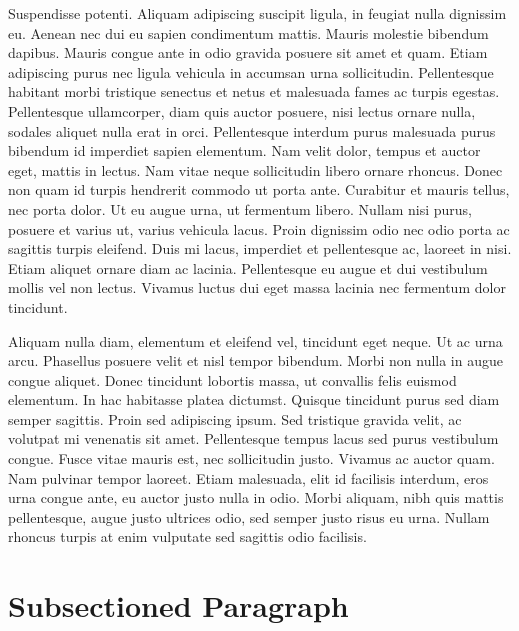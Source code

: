 \documentclass[11pt]{article}
\begin{document}
Suspendisse potenti. Aliquam adipiscing suscipit ligula, in feugiat nulla dignissim eu. Aenean nec dui eu sapien condimentum mattis. Mauris molestie bibendum dapibus. Mauris congue ante in odio gravida posuere sit amet et quam. Etiam adipiscing purus nec ligula vehicula in accumsan urna sollicitudin. Pellentesque habitant morbi tristique senectus et netus et malesuada fames ac turpis egestas. Pellentesque ullamcorper, diam quis auctor posuere, nisi lectus ornare nulla, sodales aliquet nulla erat in orci. Pellentesque interdum purus malesuada purus bibendum id imperdiet sapien elementum. Nam velit dolor, tempus et auctor eget, mattis in lectus. Nam vitae neque sollicitudin libero ornare rhoncus. Donec non quam id turpis hendrerit commodo ut porta ante. Curabitur et mauris tellus, nec porta dolor. Ut eu augue urna, ut fermentum libero. Nullam nisi purus, posuere et varius ut, varius vehicula lacus. Proin dignissim odio nec odio porta ac sagittis turpis eleifend. Duis mi lacus, imperdiet et pellentesque ac, laoreet in nisi. Etiam aliquet ornare diam ac lacinia. Pellentesque eu augue et dui vestibulum mollis vel non lectus. Vivamus luctus dui eget massa lacinia nec fermentum dolor tincidunt.

Aliquam nulla diam, elementum et eleifend vel, tincidunt eget neque. Ut ac urna arcu. Phasellus posuere velit et nisl tempor bibendum. Morbi non nulla in augue congue aliquet. Donec tincidunt lobortis massa, ut convallis felis euismod elementum. In hac habitasse platea dictumst. Quisque tincidunt purus sed diam semper sagittis. Proin sed adipiscing ipsum. Sed tristique gravida velit, ac volutpat mi venenatis sit amet. Pellentesque tempus lacus sed purus vestibulum congue. Fusce vitae mauris est, nec sollicitudin justo. Vivamus ac auctor quam. Nam pulvinar tempor laoreet. Etiam malesuada, elit id facilisis interdum, eros urna congue ante, eu auctor justo nulla in odio. Morbi aliquam, nibh quis mattis pellentesque, augue justo ultrices odio, sed semper justo risus eu urna. Nullam rhoncus turpis at enim vulputate sed sagittis odio facilisis.


\section{Subsectioned Paragraph}
\end{document}
